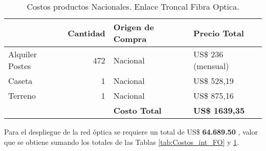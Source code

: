 \begin{table}[H]
  \centering
    \begin{tabular}{|r|r|l|l|}
    \hline
    \rowcolor[HTML]{C5D9F1} \multicolumn{1}{|l|}{\textbf{Descripción}} & \multicolumn{1}{l|}{\textbf{Cantidad}} & \textbf{Origen de Compra} & \textbf{Precio Total} \bigstrut\\
    \hline
    \multicolumn{1}{|l|}{Alquiler Postes} & 472   & Nacional & US\$ 236 (mensual) \bigstrut\\
    \hline
    \multicolumn{1}{|l|}{Caseta} & 1     & Nacional & US\$ 528,19 \bigstrut\\
    \hline
    \multicolumn{1}{|l|}{Terreno} & 1     & Nacional & US\$ 875,16 \bigstrut\\
    \hline
    \rowcolor[HTML]{C5D9F1}       &       & \textbf{Costo Total} & \textbf{US\$ 1639,35} \bigstrut\\
    \hline
    \end{tabular}%
\caption{Costos productos Nacionales. Enlace Troncal Fibra Optica.}
  \label{tab:Costos_nac_FO}%
\end{table}%



Para el despliegue de la red óptica se requiere un total de  US\$ \textbf{64.689.50} , valor que se obtiene sumando los totales de las Tablas \ref{tab:Costos_int_FO} y \ref{tab:Costos_nac_FO}.



\newpage






